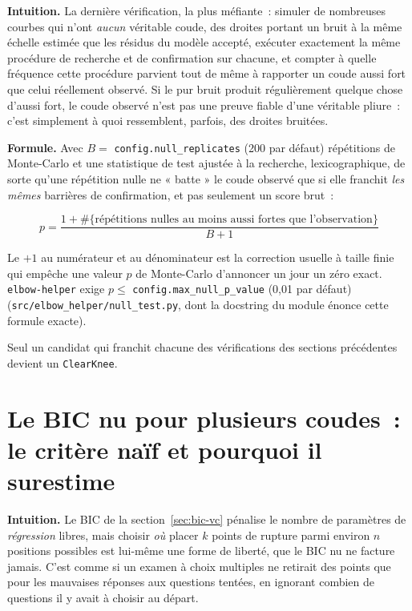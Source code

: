 \documentclass[11pt]{article}
\newcommand{\code}[1]{\texttt{#1}}
\begin{document}
\textbf{Intuition.} La dernière vérification, la plus méfiante~: simuler
de nombreuses courbes qui n'ont \emph{aucun} véritable coude, des droites
portant un bruit à la même échelle estimée que les résidus du modèle
accepté, exécuter exactement la même procédure de recherche et de
confirmation sur chacune, et compter à quelle fréquence cette procédure
parvient tout de même à rapporter un coude aussi fort que celui réellement
observé. Si le pur bruit produit régulièrement quelque chose d'aussi fort,
le coude observé n'est pas une preuve fiable d'une véritable pliure~: c'est
simplement à quoi ressemblent, parfois, des droites bruitées.

\textbf{Formule.} Avec $B = $ \code{config.null\_replicates} (200 par
défaut) répétitions de Monte-Carlo et une statistique de test ajustée à la
recherche, lexicographique, de sorte qu'une répétition nulle ne « batte »
le coude observé que si elle franchit \emph{les mêmes} barrières de
confirmation, et pas seulement un score brut~:

\begin{equation}
p = \frac{1 + \#\{\text{répétitions nulles au moins aussi fortes que l'observation}\}}{B + 1}
\end{equation}

Le $+1$ au numérateur et au dénominateur est la correction usuelle à taille
finie qui empêche une valeur $p$ de Monte-Carlo d'annoncer un jour un zéro
exact. \code{elbow-helper} exige $p \le$ \code{config.max\_null\_p\_value}
(0,01 par défaut) (\code{src/elbow\_helper/null\_test.py}, dont la
docstring du module énonce cette formule exacte).

Seul un candidat qui franchit chacune des vérifications des sections
précédentes devient un \code{ClearKnee}.

\section{Le BIC nu pour plusieurs coudes~: le critère naïf et pourquoi il surestime}

\textbf{Intuition.} Le BIC de la section~\ref{sec:bic-vc} pénalise le
nombre de paramètres de \emph{régression} libres, mais choisir \emph{où}
placer $k$ points de rupture parmi environ $n$ positions possibles est
lui-même une forme de liberté, que le BIC nu ne facture jamais. C'est comme
si un examen à choix multiples ne retirait des points que pour les
mauvaises réponses aux questions tentées, en ignorant combien de questions
il y avait à choisir au départ.
\end{document}
